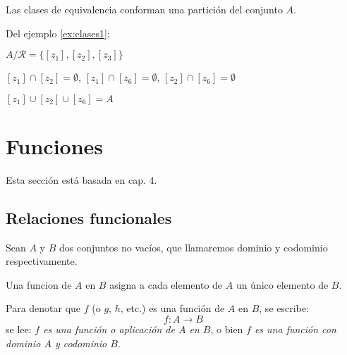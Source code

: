 Las clases de equivalencia conforman una partición del conjunto $A$.

\begin{fmd-example}[Particiones]
	Del ejemplo \ref{ex:clases1}:
	
	\begin{minipage}{.45\textwidth}
		\begin{figure}[H]
			\centering
			
		\end{figure}
	\end{minipage}
	\begin{minipage}{.45\textwidth}
		\centering
		$A/\mathcal{R} = \{ [z_1], [z_2], [z_3] \}$
		\vspace{2mm}
		
		$[z_1] \cap [z_2] = \emptyset$, $[z_1] \cap [z_6] = \emptyset$, $[z_2] \cap [z_6] = \emptyset$
		\vspace{2mm}
		
		$[z_1] \cup [z_2] \cup [z_6] = A$
	\end{minipage}
\end{fmd-example}

\section{Funciones}
Esta sección está basada en \cite{rojoAlgebra8vaEd} cap. 4. 
\subsection{Relaciones funcionales} \label{sec:relaciones}

Sean $A$ y $B$ dos conjuntos no vacíos, que llamaremos \gls{dominio} y \gls{codominio} respectivamente. \par

Una \gls{funcion} de $A$ en $B$ asigna a cada elemento de $A$ un único elemento de $B$.

Para denotar que $f$ (o $g$, $h$, etc.) es una función de $A$ en $B$, se escribe:
\[f: A \rightarrow B\]
se lee: \emph{$f$ es una función o aplicación de $A$ en $B$}, o bien \emph{$f$ es una función con dominio $A$ y codominio $B$}.

